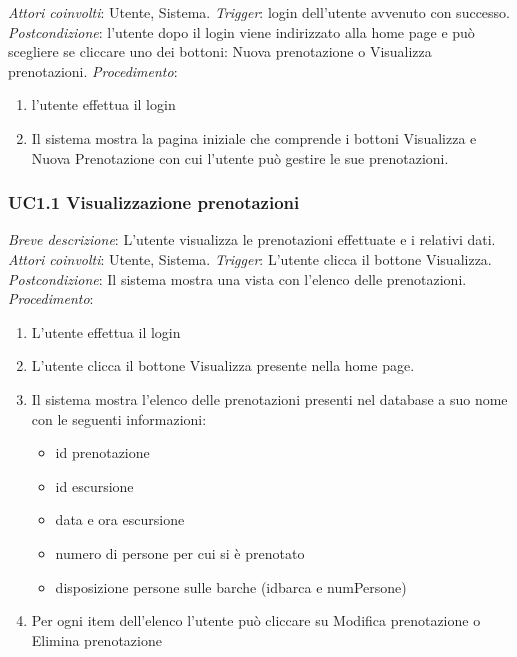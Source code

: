 \noindent \emph{Attori coinvolti}: Utente, Sistema.\medbreak
\noindent \emph{Trigger}: login dell'utente avvenuto con successo.\medbreak
\noindent \emph{Postcondizione}: l'utente dopo il login viene indirizzato alla home page e può scegliere se cliccare uno dei bottoni: Nuova prenotazione o Visualizza prenotazioni.\medbreak
\noindent \emph{Procedimento}:
\begin{enumerate}
    \item l'utente effettua il login
    \item Il sistema mostra la pagina iniziale che comprende i bottoni Visualizza e Nuova Prenotazione con cui l'utente può gestire le sue prenotazioni.
\end{enumerate}

\subsubsection{UC1.1 Visualizzazione prenotazioni}
\noindent \emph{Breve descrizione}: L'utente visualizza le prenotazioni effettuate e i relativi dati.\medbreak
\noindent \emph{Attori coinvolti}: Utente, Sistema.\medbreak
\noindent \emph{Trigger}: L'utente clicca il bottone Visualizza.\medbreak
\noindent \emph{Postcondizione}: Il sistema mostra una vista con l'elenco delle prenotazioni.\medbreak
\noindent \emph{Procedimento}:

\begin{enumerate}
    \item L'utente effettua il login
    \item L'utente clicca il bottone Visualizza presente nella home page.
    \item Il sistema mostra l'elenco delle prenotazioni presenti nel database a suo nome con le seguenti informazioni:
    \begin{itemize}
        \item id prenotazione
        \item id escursione
        \item data e ora escursione
        \item numero di persone per cui si è prenotato
        \item disposizione persone sulle barche (idbarca e numPersone)
    \end{itemize}
    \item Per ogni item dell'elenco l'utente può cliccare su Modifica prenotazione o Elimina prenotazione
\end{enumerate}

